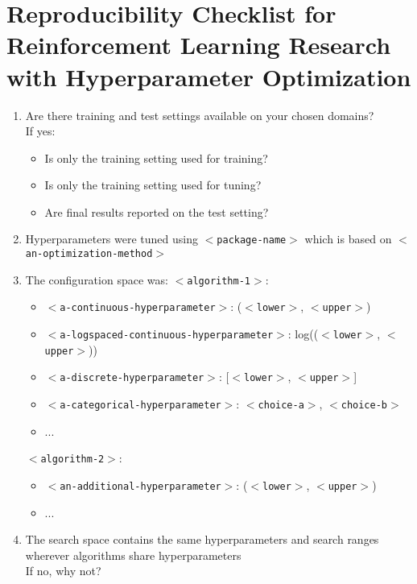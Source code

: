 \documentclass{article}
\newcommand{\cmark}{\ding{51}}%
\newcommand{\xmark}{\ding{55}}%
\begin{document}
\section{Reproducibility Checklist for Reinforcement Learning Research with Hyperparameter Optimization}
\begin{enumerate}
    \itemsep0em 
    \item Are there training and test settings available on your chosen domains? \\ If yes:
    \begin{itemize}
        \item Is only the training setting used for training? \cmark \xmark
        \item Is only the training setting used for tuning? \cmark \xmark
        \item Are final results reported on the test setting? \cmark \xmark
    \end{itemize}
    \item Hyperparameters were tuned using \texttt{$<$package-name$>$} which is based on \texttt{$<$an-optimization-method$>$}
    \item The configuration space was:
    \texttt{$<$algorithm-1$>$}:
    \begin{itemize}
        \item \texttt{$<$a-continuous-hyperparameter$>$}: (\texttt{$<$lower$>$}, \texttt{$<$upper$>$})
        \item \texttt{$<$a-logspaced-continuous-hyperparameter$>$}: log((\texttt{$<$lower$>$}, \texttt{$<$upper$>$}))
        \item \texttt{$<$a-discrete-hyperparameter$>$}: [\texttt{$<$lower$>$}, \texttt{$<$upper$>$}]
        \item \texttt{$<$a-categorical-hyperparameter$>$}: {\texttt{$<$choice-a$>$}, \texttt{$<$choice-b$>$}}
        \item ...
    \end{itemize}
    \texttt{$<$algorithm-2$>$}:
    \begin{itemize}
        \item \texttt{$<$an-additional-hyperparameter$>$}: (\texttt{$<$lower$>$}, \texttt{$<$upper$>$})
        \item ...
    \end{itemize}
    \item The search space contains the same hyperparameters and search ranges wherever algorithms share hyperparameters \cmark \xmark \\ If no, why not?

\end{enumerate}
\end{document}
